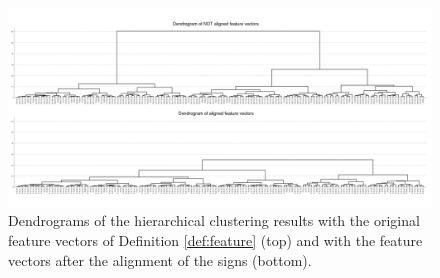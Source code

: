 \documentclass{article}
\begin{document}
\begin{figure}[t]
\label{fig:food_v}
\includegraphics[width=160mm]{food_dendrogram.png}\vspace{-0.02\hsize}
\caption{Dendrograms of the hierarchical clustering results with the original feature vectors of Definition \ref{def:feature} (top) and with the feature vectors after the alignment of the signs (bottom). }\vspace{0.03\hsize}
\label{fig:food_dendrogram}
\end{figure}
\end{document}
